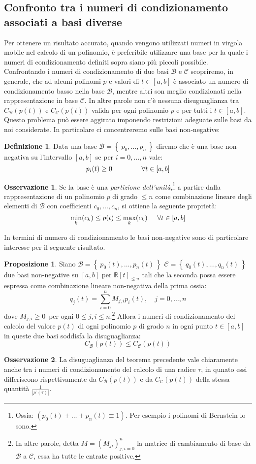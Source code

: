 \documentclass[a4paper,12pt]{report}
\newcommand\tab[1][0.5cm]{\hspace*{#1}}
\theoremstyle{definition}
\newtheorem{defin}{Definizione}[chapter]
\newtheorem{oss}{Osservazione}[chapter]
\newtheorem{prop}{Proposizione}[chapter]
\newcommand{\numberset}{\mathbb}
\newcommand{\R}{{\numberset{R}}}
\newcommand{\Calb}{{\mathcal{B}}}
\newcommand{\Calc}{{\mathcal{C}}}
\begin{document}
\subsection{Confronto tra i numeri di condizionamento associati a basi diverse}
Per ottenere un risultato accurato, quando vengono utilizzati numeri in virgola mobile nel calcolo di un polinomio, è preferibile utilizzare una base per la quale i numeri di condizionamento definiti sopra siano più piccoli possibile. \\
Confrontando i numeri di condizionamento di due basi $\Calb$ e $\Calc$ scopriremo, in generale, che ad alcuni polinomi $p$ e valori di $t \in [a,b]$ è associato un numero di condizionamento basso nella base $\Calb$, mentre altri son meglio condizionati nella rappresentazione in base $\Calc$. In altre parole non c'è nessuna disuguaglianza tra $C_{\Calb}(p(t))$ e $C_{\Calc}(p(t))$ valida per ogni polinomio $p$ e per tutti i $t \in [a,b]$.\\
Questo problema può essere aggirato imponendo restrizioni adeguate sulle basi da noi considerate. In particolare ci concentreremo sulle basi non-negative:
\begin{defin}
	Data una base $\Calb = \left\{\ p_0, \ldots, p_n  \ \right\}$ diremo che è una base non-negativa su l'intervallo $[a,b]$ se per $i = 0, \ldots, n$ vale:$$p_i(t) \ge 0 \tab \tab \tab \forall t \in [a,b]$$
\end{defin}
\begin{oss}
	Se la base è una \textit{partizione dell'unità},\footnote{Ossia: $(p_0(t) + \ldots + p_n(t) \equiv 1)$. Per esempio i polinomi di Bernstein lo sono.} a partire dalla rappresentazione di un polinomio $p$ di grado $\le n$ come combinazione lineare degli elementi di $\Calb$ con coefficienti $c_0, \ldots, c_n$, si ottiene la seguente proprietà: $$\underset{k}{\min} (c_k) \le p(t) \le \underset{k}{\max} (c_k) \tab \forall t \in [a,b]$$ 
\end{oss}
In termini di numero di condizionamento le basi non-negative sono di particolare interesse per il seguente risultato.
\begin{prop}
	Siano $\Calb = \left\{\ p_0(t), \ldots, p_n(t) \ \right\}$ $\Calc = \left\{\ q_0(t), \ldots, q_n(t) \ \right\}$ due basi non-negative su $[a,b]$ per $\R [t]_{\le n}$ tali che la seconda possa essere espressa come combinazione lineare non-negativa della prima ossia:$$q_j(t) = \sum_{i=0}^{n} M_{j,i} p_i(t), \quad j = 0, \ldots, n$$
	dove $M_{j,i} \ge 0 $\ per ogni $ 0 \le j,i \le n$.\footnote{In altre parole, detta $M=(M_{ji})_{j,i=0}^n$ la matrice di cambiamento di base da $\Calb$ a $\Calc$, essa ha tutte le entrate positive.}
	Allora i numeri di condizionamento del calcolo del valore $p(t)$ di ogni polinomio $p$ di grado $n$ in ogni punto $t \in [a,b] $ in queste due basi soddisfa la disuguaglianza:
	$$C_\Calb (p(t)) \le C_\Calc (p(t))$$
\end{prop}
\begin{oss}
	La disuguaglianza del teorema precedente vale chiaramente anche tra i numeri di condizionamento del calcolo di una radice $\tau$, in qunato essi differiscono rispettivamente da $C_\Calb (p(t))$ e da $C_\Calc (p(t))$ della stessa quantità $\frac{1}{\left|  p^\prime(\tau) \right|}.$
\end{oss}
\end{document}
